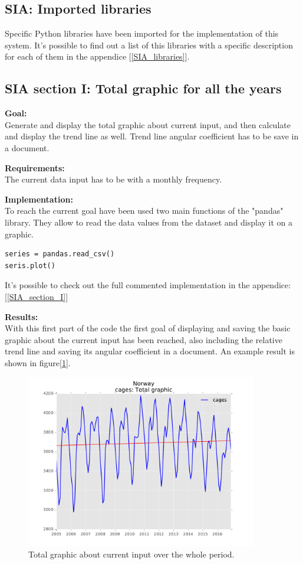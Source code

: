 \subsection{SIA: Imported libraries}
Specific Python libraries have been imported for the implementation of this system.
It's possible to find out a list of this libraries with a specific description for each of them in the appendice [\ref{SIA_libraries}].

\newpage

\subsection{SIA section I: Total graphic for all the years}
\textbf{Goal:}\\
Generate and display the total graphic about current input, and then calculate and display the trend line as well. Trend line angular coefficient has to be save in a document.

\textbf{Requirements:}\\
The current data input has to be with a monthly frequency. 

\textbf{Implementation:}\\
To reach the current goal have been used two main functions of the "pandas" library. They allow to read the data values from the dataset and display it on a graphic.
\begin{lstlisting}
series = pandas.read_csv()
seris.plot()
\end{lstlisting}

It's possible to check out the full commented implementation in the appendice: [\ref{SIA_section_I}]

\textbf{Results:} \\
With this first part of the code the first goal of displaying and saving the basic graphic about the current input has been reached, also including the relative trend line and saving its angular coefficient in a document. An example result is shown in figure[\ref{Total_graphic}].

\begin{figure}[H]
\includegraphics[width=0.9\textwidth]{Files/Cages_Total.pdf}
\caption{Total graphic about current input over the whole period.}
\label{Total_graphic}
\end{figure}



